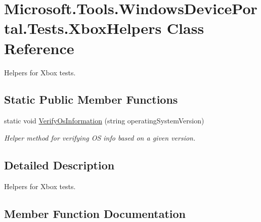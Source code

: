 \hypertarget{class_microsoft_1_1_tools_1_1_windows_device_portal_1_1_tests_1_1_xbox_helpers}{}\section{Microsoft.\+Tools.\+Windows\+Device\+Portal.\+Tests.\+Xbox\+Helpers Class Reference}
\label{class_microsoft_1_1_tools_1_1_windows_device_portal_1_1_tests_1_1_xbox_helpers}


Helpers for Xbox tests.  


\subsection*{Static Public Member Functions}
\begin{DoxyCompactItemize}
\item 
static void \hyperlink{class_microsoft_1_1_tools_1_1_windows_device_portal_1_1_tests_1_1_xbox_helpers_a6cafa2e93646792c639005577511da9d}{Verify\+Os\+Information} (string operating\+System\+Version)
\begin{DoxyCompactList}\small\item\em Helper method for verifying OS info based on a given version. \end{DoxyCompactList}\end{DoxyCompactItemize}


\subsection{Detailed Description}
Helpers for Xbox tests. 



\subsection{Member Function Documentation}
